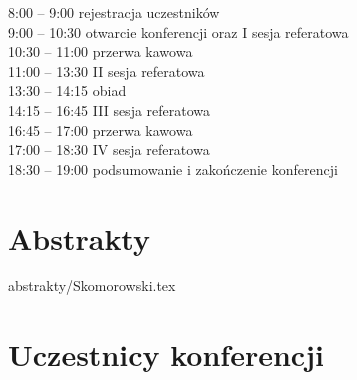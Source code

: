 \documentclass[12pt,oneside]{book}
\begin{document}
\Large{8:00 – 9:00 rejestracja uczestników\\
9:00 – 10:30 otwarcie konferencji oraz I sesja referatowa\\
10:30 – 11:00 przerwa kawowa\\
11:00 – 13:30 II  sesja referatowa \\
13:30 – 14:15 obiad\\
14:15 – 16:45 III sesja referatowa\\
16:45 – 17:00 przerwa kawowa\\
17:00 – 18:30 IV sesja referatowa\\
18:30 – 19:00 podsumowanie i zakończenie konferencji}

%
%

\large{
\tableofcontents
}
\mainmatter

\pagestyle{mainmatter}%


\chapter{Abstrakty}
\large
\vspace{-0.5cm}
 \label{bielecki}
\newpage
 \label{bilinska}
\newpage
 \label{franczyk}
\newpage
 \label{kolendowicz}
\newpage
 \label{guzik}
\newpage
 \label{poreba}
\newpage 	
 {abstrakty/Skomorowski.tex} \label{skomorowski}
\newpage
 \label{wieczorek}
\newpage
 \label{sekowski}
\newpage
 \label{pawliczek}
\newpage
 \label{cybulski}
\newpage
 \label{piasecki}
\newpage
 \label{sypniewski}



\chapter{Uczestnicy konferencji}
\end{document}
